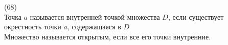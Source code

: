 (68)\\
Точка $a$ называется внутренней точкой множества $D$, если существует окрестность точки $a$, содержащаяся в $D$\\
Множество называется открытым, если все его точки внутренние.